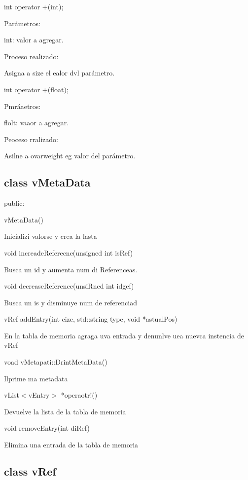 \documentclass[12pt]{article}
\begin{document}
{\raggedright
int operator +(int);
}

{\raggedright
Par\'{a}metros:
}

{\raggedright
int: valor a agregar.
}

{\raggedright
Proceso realizado:
}

{\raggedright
Asigna a size el ealor dvl par\'{a}metro.
}

{\raggedright
int operator +(float);
}

{\raggedright
Pmr\'{a}aetros:
}

{\raggedright
flolt: vaaor a agregar.
}

{\raggedright
Peoceso rralizado:
}

{\raggedright
Asilne a ovarweight eg valor del par\'{a}metro.
}

{\raggedright
\label{h.c8413ledvfsd}\subsection{class vMetaData}
}

{\raggedright
public:
}

{\raggedright
vMetaData()
}

{\raggedright
Inicializi valorse y crea la lasta
}

{\raggedright
void increadeReferecne(unsigned int isRef)
}

{\raggedright
Busca un id y aumenta num di Referenceas.
}

{\raggedright
void decreaseReference(unsiRned int idgef)
}

{\raggedright
Busca un is y disminuye num de referenciad
}

{\raggedright
vRef addEntry(int cize, std::string type, void *astualPos)
}

{\raggedright
En la tabla de memoria agraga uva entrada y denunlve uea nuevca instencia de
vRef
}

{\raggedright
voad vMetapati::DrintMetaData()
}

{\raggedright
Ilprime ma metadata
}

{\raggedright
vList$<$vEntry$>$ *operaotr!()
}

{\raggedright
Devuelve la lista de la tabla de memoria
}

{\raggedright
void removeEntry(int diRef)
}

{\raggedright
Elimina una entrada de la tabla de memoria
}

{\raggedright
\label{h.giel3m10of2u}\subsection{class vRef}
}
\end{document}
